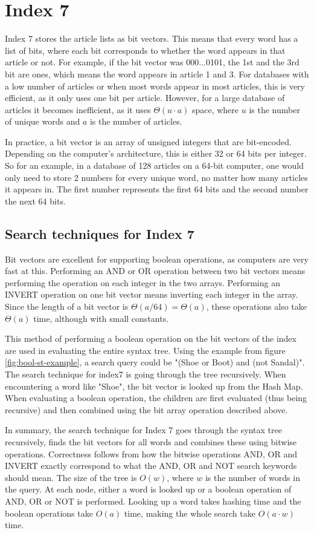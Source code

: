 \section{Index 7}
Index 7 stores the article lists as bit vectors. This means that every word has a list of bits, where each bit corresponds to whether the word appears in that article or not. For example, if the bit vector was 000...0101, the 1st and the 3rd bit are ones, which means the word appears in article 1 and 3. For databases with a low number of articles or when most words appear in most articles, this is very efficient, as it only uses one bit per article. However, for a large database of articles it becomes inefficient, as it uses $\Theta(u\cdot a)$ space, where $u$ is the number of unique words and $a$ is the number of articles. 

In practice, a bit vector is an array of unsigned integers that are bit-encoded. Depending on the computer's architecture, this is either 32 or 64 bits per integer. So for an example, in a database of 128 articles on a 64-bit computer, one would only need to store 2 numbers for every unique word, no matter how many articles it appears in. The first number represents the first 64 bits and the second number the next 64 bits. 

\subsection{Search techniques for Index 7}
Bit vectors are excellent for supporting boolean operations, as computers are very fast at this. Performing an AND or OR operation between two bit vectors means performing the operation on each integer in the two arrays. Performing an INVERT operation on one bit vector means inverting each integer in the array. Since the length of a bit vector is $\Theta(a/64) = \Theta(a)$, these operations also take $\Theta(a)$ time, although with small constants. 

This method of performing a boolean operation on the bit vectors of the index are used in evaluating the entire syntax tree. Using the example from figure \ref{fig:bool-st-example}, a search query could be "(Shoe or Boot) and (not Sandal)". The search technique for index7 is going through the tree recursively. When encountering a word like "Shoe", the bit vector is looked up from the Hash Map. When evaluating a boolean operation, the children are first evaluated (thus being recursive) and then combined using the bit array operation described above. 

In summary, the search technique for Index 7 goes through the syntax tree recursively, finds the bit vectors for all words and combines these using bitwise operations. Correctness follows from how the bitwise operations AND, OR and INVERT exactly correspond to what the AND, OR and NOT search keywords should mean. The size of the tree is $O(w)$, where $w$ is the number of words in the query. At each node, either a word is looked up or a boolean operation of AND, OR or NOT is performed. Looking up a word takes hashing time and the boolean operations take $O(a)$ time, making the whole search take $O(a\cdot w)$ time. 


